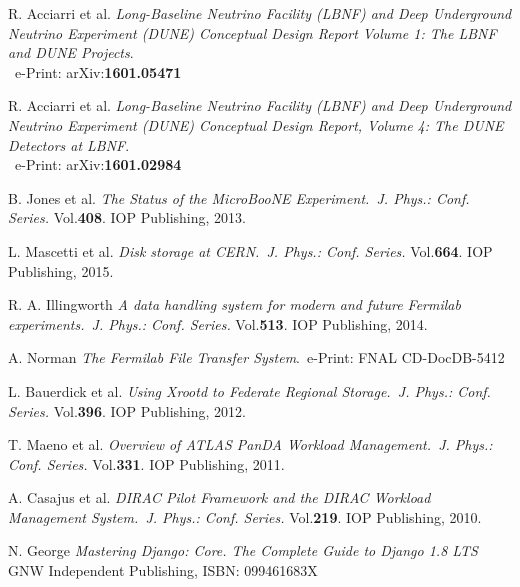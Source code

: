 \documentclass{PoS}
\begin{document}
\begin{thebibliography}{99}



R. Acciarri et al.
\emph{Long-Baseline Neutrino Facility (LBNF) and Deep Underground Neutrino Experiment (DUNE) Conceptual Design Report Volume 1: The LBNF and DUNE Projects}.\\ ~e-Print: arXiv:\textbf{1601.05471}

R. Acciarri et al.
\emph{Long-Baseline Neutrino Facility (LBNF) and Deep Underground Neutrino Experiment (DUNE) Conceptual Design Report, Volume 4: The DUNE Detectors at LBNF}.\\~e-Print: arXiv:\textbf{1601.02984}


B. Jones et al.  \emph{The Status of the MicroBooNE Experiment.~J. Phys.: Conf. Series.} Vol.\textbf{408}. IOP Publishing, 2013.

 L. Mascetti et al. \emph{Disk storage at CERN.~J. Phys.: Conf. Series.} Vol.\textbf{664}. IOP Publishing, 2015.


R. A. Illingworth \emph{A data handling system for modern and future Fermilab experiments.~J. Phys.: Conf. Series.} Vol.\textbf{513}. IOP Publishing, 2014.

A. Norman \emph{The Fermilab File Transfer System}.~e-Print: FNAL CD-DocDB-5412


L. Bauerdick et al. \emph{Using Xrootd to Federate Regional Storage.~J. Phys.: Conf. Series.} Vol.\textbf{396}. IOP Publishing, 2012.

T. Maeno et al. \emph{Overview of ATLAS PanDA Workload Management.~J. Phys.: Conf. Series.} Vol.\textbf{331}. IOP Publishing, 2011.


A. Casajus et al.  \emph{DIRAC Pilot Framework and the DIRAC
Workload Management System.~J. Phys.: Conf. Series.} Vol.\textbf{219}. IOP Publishing, 2010.

N. George \emph{Mastering Django: Core. The Complete Guide to Django 1.8 LTS}~ GNW Independent Publishing, ISBN: 099461683X



\end{thebibliography}
\end{document}

